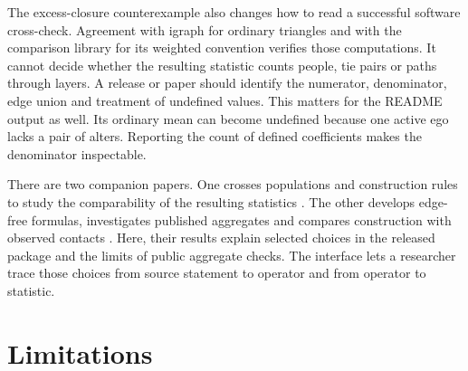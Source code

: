 The excess-closure counterexample also changes how to read a successful software cross-check. Agreement with igraph for ordinary triangles and with the comparison library for its weighted convention verifies those computations. It cannot decide whether the resulting statistic counts people, tie pairs or paths through layers. A release or paper should identify the numerator, denominator, edge union and treatment of undefined values. This matters for the README output as well. Its ordinary mean can become undefined because one active ego lacks a pair of alters. Reporting the count of defined coefficients makes the denominator inspectable.

There are two companion papers. One crosses populations and construction rules to study the comparability of the resulting statistics \citep{almamunbuilt2026}. The other develops edge-free formulas, investigates published aggregates and compares construction with observed contacts \citep{almamunpredicting2026}. Here, their results explain selected choices in the released package and the limits of public aggregate checks. The interface lets a researcher trace those choices from source statement to operator and from operator to statistic.

\section{Limitations}

